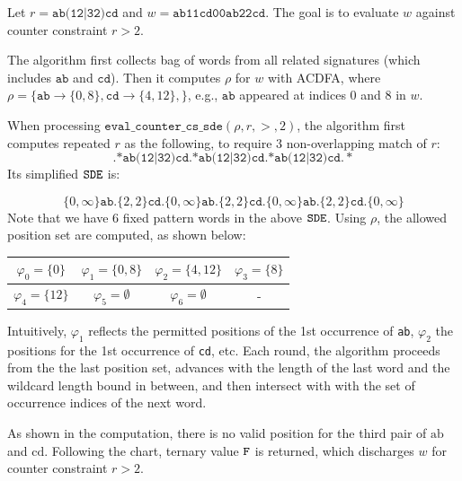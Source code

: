 \begin{example} Let $r = \texttt{ab(12|32)cd}$ and
$w = \texttt{ab11cd00ab22cd}$. The goal is to
evaluate $w$ against counter constraint $r>2$. 

The algorithm first collects bag of words from all related
signatures (which includes $\texttt{ab}$ and $\texttt{cd}$).
Then it computes 
$\rho$ for $w$ with ACDFA, where $\rho = \{
	\texttt{ab} \rightarrow \{0, 8\},
	\texttt{cd} \rightarrow \{4, 12\},
\}$, e.g., $\texttt{ab}$ appeared at indices $0$ and $8$
in $w$.

When processing
$\texttt{eval\_counter\_cs\_sde}(\rho, r, >, 2)$,
the algorithm first computes repeated $r$ as the following,
to require $3$ non-overlapping match of $r$:
\[
\texttt{.*ab(12|32)cd.*ab(12|32)cd.*ab(12|32)cd}.*
\]
Its simplified $\texttt{SDE}$ is:

\[
\{0,\infty\}
\texttt{ab}.\{2,2\}
\texttt{cd}.\{0,\infty\}
\texttt{ab}.\{2,2\}
\texttt{cd}.\{0,\infty\}
\texttt{ab}.\{2,2\}
\texttt{cd}.\{0,\infty\}
\]
Note that we have $6$ fixed pattern words in the above $\texttt{SDE}$.
Using $\rho$, the allowed position set are computed, as shown
below:
\begin{center}
\begin{tabular}{c | c | c | c }
\hline
 $\varphi_0 = \{0\}$  &
 $\varphi_1 = \{0, 8\}$  &
 $\varphi_2 = \{4, 12\}$  &
 $\varphi_3 = \{8\}$  
 \\
\hline
 $\varphi_4 = \{12\}$  &
 $\varphi_5 = \emptyset$  &
 $\varphi_6 = \emptyset$  &
 - \\
\hline
\end{tabular}
\end{center}

Intuitively, $\varphi_1$ reflects the permitted positions
of the 1st occurrence of \texttt{ab}, $\varphi_2$ the positions
for the 1st occurrence of \texttt{cd}, etc. Each round, the algorithm
proceeds from the the last position set, advances with the length
of the last word and the wildcard length bound in between, and
then intersect with with the set of occurrence indices of the
next word. 

As shown in the computation, there is no valid position
for the third pair of $\text{ab}$ and $\text{cd}$.
Following the chart, ternary value $\texttt{F}$ is returned,
which discharges $w$ for counter constraint $r>2$.
\end{example}


